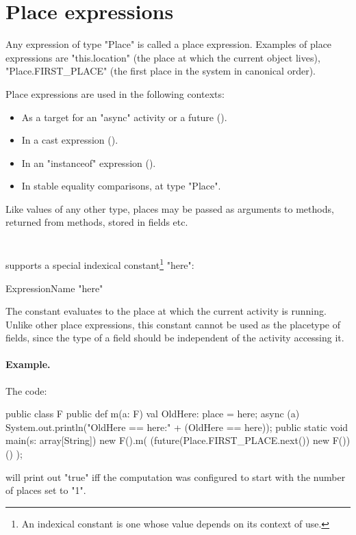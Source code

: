 \section{Place expressions}
Any expression of type \xcd"Place" is called a place expression. 
Examples of place expressions are \xcd"this.location" (the place
at which the current object lives), \xcd"Place.FIRST_PLACE"
(the first place in the system in canonical order). 

Place expressions are used in the following contexts: 
\begin{itemize}
\item As a target for an \xcd"async" activity or a future
().
\item In a cast expression ().
\item In an \xcd"instanceof" expression ().
\item In stable equality comparisons, at type \xcd"Place".
\end{itemize}

Like values of any other type, places may be passed as arguments
to methods, returned from methods, stored in fields etc.

\section{}\label{Here}
\Xten{} supports a special indexical constant\footnote{
An indexical constant is one whose value depends on its context
of use.} \xcd"here":

\begin{grammar}
ExpressionName \: \xcd"here" \\
\end{grammar}

The constant evaluates to the place at which the current activity is
running. Unlike other place expressions, this constant cannot be 
used as the placetype of fields, since the type of a field 
should be independent of the activity accessing it.

\paragraph{Example.}
The code:
\begin{xten}
public class F {
  public def m(a: F) {
    val OldHere: place = here;
    async (a) {
      System.out.println("OldHere == here:" 
                         + (OldHere == here));
    }
  }
  public static void main(s: array[String]) {
    new F().m( (future(Place.FIRST_PLACE.next()) new F())() );
  }
}  
\end{xten}
\noindent will print out \xcd"true" iff the computation was configured
to start with the number of places set to \xcd"1". 


